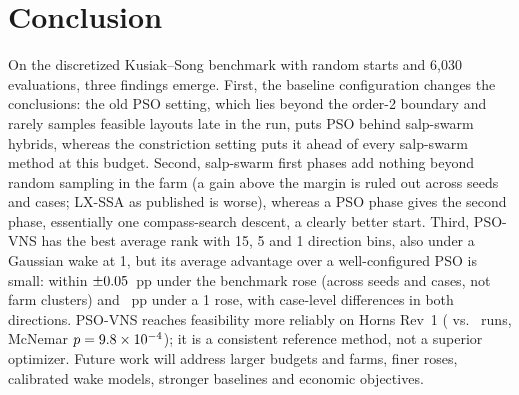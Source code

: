 \section{Conclusion}
\label{sec:conclusion}
On the discretized Kusiak--Song benchmark with random starts and 6,030 evaluations, three findings emerge. First, the baseline configuration changes the conclusions: the old PSO setting, which lies beyond the order-2 boundary and rarely samples feasible layouts late in the run, puts PSO behind salp-swarm hybrids, whereas the constriction setting puts it ahead of every salp-swarm method at this budget. Second, salp-swarm first phases add nothing beyond random sampling in the farm (a gain above the margin is ruled out across seeds and cases; LX-SSA as published is worse), whereas a PSO phase gives the second phase, essentially one compass-search descent, a clearly better start. Third, PSO-VNS has the best average rank with 15\textdegree{}, 5\textdegree{} and 1\textdegree{} direction bins, also under a Gaussian wake at 1\textdegree{}, but its average advantage over a well-configured PSO is small: within $\pm0.05$~pp under the benchmark rose (across seeds and cases, not farm clusters) and \NFPairMeanOne~pp under a 1\textdegree{} rose, with case-level differences in both directions. PSO-VNS reaches feasibility more reliably on Horns Rev~1 (\NHRFeasPSOVNS{} vs.\ \NHRFeasPSO{} runs, McNemar $p=9.8\times10^{-4}$); it is a consistent reference method, not a superior optimizer. Future work will address larger budgets and farms, finer roses, calibrated wake models, stronger baselines and economic objectives.
